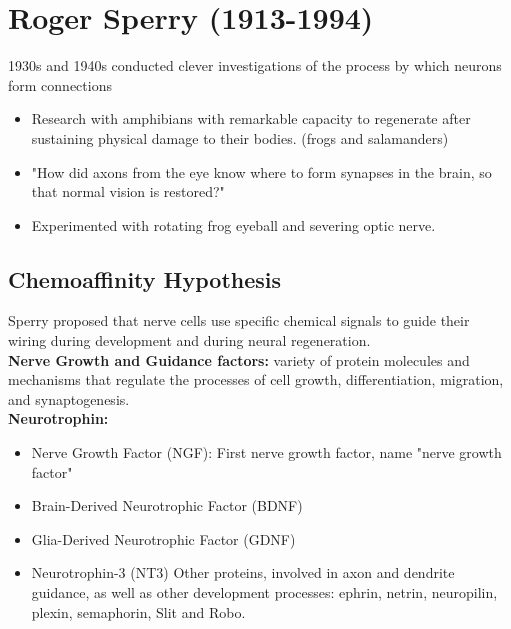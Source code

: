 \documentclass{article}
\begin{document}
\section{Roger Sperry (1913-1994)}
1930s and 1940s conducted clever investigations of the process by which neurons form connections
\begin{itemize}
    \item Research with amphibians with remarkable capacity to regenerate after sustaining physical damage to their bodies. (frogs and salamanders)
    \item "How did axons from the eye know where to form synapses in the brain, so that normal vision is restored?"
    \item Experimented with rotating frog eyeball and severing optic nerve. 
\end{itemize}
\subsection{Chemoaffinity Hypothesis}
Sperry proposed that nerve cells use specific chemical signals to guide their wiring during development and during neural regeneration. \\
\textbf{Nerve Growth and Guidance factors:} variety of protein molecules and mechanisms that regulate the processes of cell growth, differentiation, migration, and synaptogenesis. \\
\textbf{Neurotrophin:} 
\begin{itemize}
    \item Nerve Growth Factor (NGF): First nerve growth factor, name "nerve growth factor"
    \item Brain-Derived Neurotrophic Factor (BDNF)
    \item Glia-Derived Neurotrophic Factor (GDNF)
    \item Neurotrophin-3 (NT3)
Other proteins, involved in axon and dendrite guidance, as well as other development processes: ephrin, netrin, neuropilin, plexin, semaphorin, Slit and Robo.
\end{itemize}
 
\end{document}
